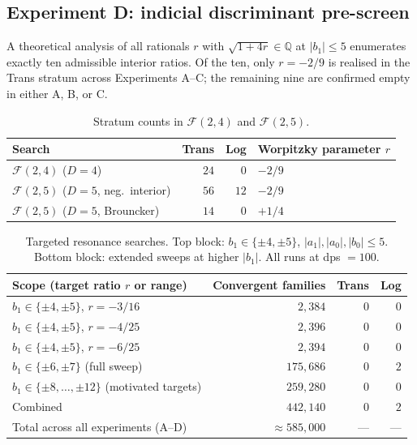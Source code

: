 \documentclass[11pt]{amsart}
\theoremstyle{definition}
\theoremstyle{remark}
\newcommand{\FF}{\mathcal{F}}
\begin{document}
\subsection*{Experiment D: indicial discriminant pre-screen}
A theoretical analysis of all rationals $r$ with $\sqrt{1 + 4r} \in
\mathbb Q$ at $|b_1| \le 5$ enumerates exactly ten admissible interior
ratios.  Of the ten, only $r = -2/9$ is realised in the Trans stratum
across Experiments A--C; the remaining nine are confirmed empty in
either A, B, or C.

\begin{table}[t]
\centering
\caption{Stratum counts in $\FF(2,4)$ and $\FF(2,5)$.}
\label{tab:censuses}
\begin{tabular}{lrrl}
\toprule
Search            & Trans & Log & Worpitzky parameter $r$ \\
\midrule
$\FF(2,4)$ ($D=4$)         & $24$ & $0$  & $-2/9$         \\
$\FF(2,5)$ ($D=5$, neg.\ interior) & $56$ & $12$ & $-2/9$         \\
$\FF(2,5)$ ($D=5$, Brouncker)      & $14$ & $0$  & $+1/4$         \\
\bottomrule
\end{tabular}
\end{table}

\begin{table}[t]
\centering
\caption{Targeted resonance searches.  Top block: $b_1 \in \{\pm 4,
\pm 5\}$, $|a_1|,|a_0|,|b_0| \le 5$.  Bottom block: extended
sweeps at higher $|b_1|$.  All runs at dps $=100$.}
\label{tab:resonance}
\begin{tabular}{lrrr}
\toprule
Scope (target ratio $r$ or range) & Convergent families & Trans & Log \\
\midrule
$b_1 \in \{\pm 4, \pm 5\}$, $r = -3/16$ & $2{,}384$ & $0$ & $0$ \\
$b_1 \in \{\pm 4, \pm 5\}$, $r = -4/25$ & $2{,}396$ & $0$ & $0$ \\
$b_1 \in \{\pm 4, \pm 5\}$, $r = -6/25$ & $2{,}394$ & $0$ & $0$ \\
\midrule
$b_1 \in \{\pm 6, \pm 7\}$ (full sweep) & $175{,}686$ & $0$ & $2$ \\
$b_1 \in \{\pm 8,\dots,\pm 12\}$ (motivated targets) & $259{,}280$ & $0$ & $0$ \\
\midrule
Combined        & $442{,}140$ & $0$ & $2$ \\
Total across all experiments (A--D) & $\approx 585{,}000$ & --- & --- \\
\bottomrule
\end{tabular}
\end{table}
\end{document}
